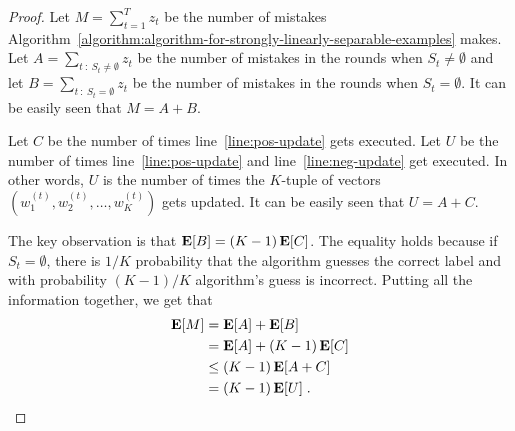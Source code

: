 \begin{proof}
Let $M = \sum_{t=1}^T z_t$ be the number of
mistakes Algorithm~\ref{algorithm:algorithm-for-strongly-linearly-separable-examples} makes.
Let $A
= \sum_{t ~:~ S_t \neq \emptyset} z_t$ be the number of mistakes in the rounds
when $S_t \neq \emptyset$ and let $B = \sum_{t ~:~ S_t = \emptyset} z_t$ be the
number of mistakes in the rounds when $S_t = \emptyset$.
It can be easily seen that $M = A + B$. %

Let $C$ be the number of times line~\ref{line:pos-update} gets executed. Let $U$ be the number of
times line~\ref{line:pos-update} and line~\ref{line:neg-update} get executed. In other words, $U$ is the number of
times the $K$-tuple of vectors $(w_1^{(t)}, w_2^{(t)}, \dots, w_K^{(t)})$ gets
updated. It can be easily seen that $U = A + C$.

The key observation is that $\operatorname*{\mathbf{E}}[B] = (K-1) \operatorname*{\mathbf{E}}[C]$. The equality holds
because if $S_t = \emptyset$, there is $1/K$ probability that the algorithm
guesses the correct label and with probability $(K-1)/K$ algorithm's guess is
incorrect. Putting all the information together, we get that
\begin{align*}
\operatorname*{\mathbf{E}}[M]
& = \operatorname*{\mathbf{E}}[A] + \operatorname*{\mathbf{E}}[B] \\
& = \operatorname*{\mathbf{E}}[A] + (K-1) \operatorname*{\mathbf{E}}[C]  \\
& \le (K-1) \operatorname*{\mathbf{E}}[A + C] \\
& = (K-1) \operatorname*{\mathbf{E}}[U]  \; .
\end{align*}


\end{proof}
